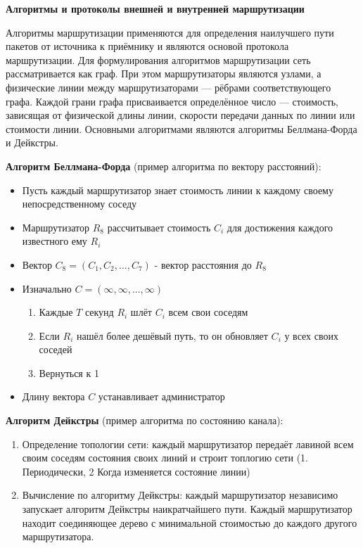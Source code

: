 
\bigbreak
\textbf{Алгоритмы и протоколы внешней и внутренней маршрутизации}

Алгоритмы маршрутизации применяются для определения наилучшего пути пакетов от источника к приёмнику и являются основой протокола маршрутизации.
Для формулирования алгоритмов маршрутизации сеть рассматривается как граф.
При этом маршрутизаторы являются узлами, а физические линии между маршрутизаторами --- рёбрами соответствующего графа.
Каждой грани графа присваивается определённое число --- стоимость, зависящая от физической длины линии, скорости передачи данных по линии или стоимости линии.
Основными алгоритмами являются алгоритмы Беллмана-Форда и Дейкстры.

\textbf{Алгоритм Беллмана-Форда} (пример алгоритма по вектору расстояний):

\begin{itemize}
    \item Пусть каждый маршрутизатор знает стоимость линии к каждому своему непосредственному соседу
    \item Маршрутизатор $R_8$ рассчитывает стоимость $C_i$ для достижения каждого известного ему $R_i$
    \item Вектор $C_8 = (C_1,C_2,...,C_7)$ - вектор расстояния до $R_8$
    \item Изначально $C = (\infty,\infty,...,\infty)$
    \begin{enumerate}
        \item Каждые $T$ секунд $R_i$ шлёт $C_i$ всем свои соседям
        \item Если $R_i$ нашёл более дешёвый путь, то он обновляет $C_i$ у всех своих соседей
        \item Вернуться к 1
    \end{enumerate}
    \item Длину вектора $C$ устанавливает администратор
\end{itemize}

\textbf{Алгоритм Дейкстры} (пример алгоритма по состоянию канала):

\begin{enumerate}
    \item Определение топологии сети: каждый маршрутизатор передаёт лавиной всем своим соседям состояния своих линий и строит топлогию сети (1. Периодически, 2 Когда изменяется состояние линии)
    \item Вычисление по алгоритму Дейкстры: каждый маршрутизатор независимо запускает алгоритм Дейкстры наикратчайшего пути.
    Каждый маршрутизатор находит соединяющее дерево с минимальной стоимостью до каждого другого маршрутизатора.
\end{enumerate}

